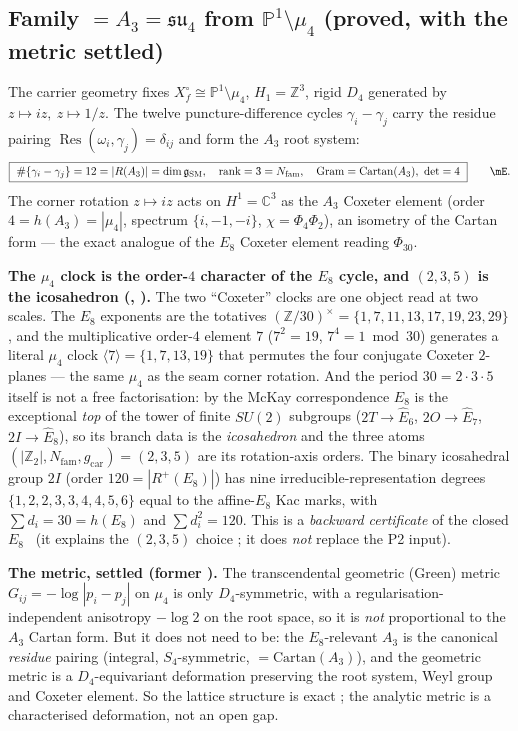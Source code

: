 \documentclass[11pt,a4paper]{article}
\newcommand{\gcar}{g_{\mathrm{car}}}
\newcommand{\Nfam}{N_{\mathrm{fam}}}
\newcommand{\dimg}{\dim\mathfrak g_{\mathrm{SM}}}
\newcommand{\Z}{\mathbb{Z}}
\theoremstyle{definition}
\begin{document}
\subsection{Family $=A_3=\mathfrak{su}_4$ from $\mathbb P^1\setminus\mu_4$ (proved, with the metric settled)}
The carrier geometry fixes $X_f^\circ\cong\mathbb P^1\setminus\mu_4$, $H_1=\mathbb Z^3$, rigid $D_4$ generated by
$z\mapsto iz,\ z\mapsto1/z$. The twelve puncture-difference cycles $\gamma_i-\gamma_j$ carry the
residue pairing $\operatorname{Res}(\omega_i,\gamma_j)=\delta_{ij}$ and form the $A_3$ root system:
\begin{equation}
  \boxed{\ \#\{\gamma_i-\gamma_j\}=12=|R(A_3)|=\dimg,\quad \operatorname{rank}=3=\Nfam,\quad
  \mathrm{Gram}=\mathrm{Cartan}(A_3),\ \det=4\ }\qquad\mE .
\end{equation}
The corner rotation $z\mapsto iz$ acts on $H^1=\mathbb C^3$ as the $A_3$ Coxeter element (order
$4=h(A_3)=|\mu_4|$, spectrum $\{i,-1,-i\}$, $\chi=\Phi_4\Phi_2$), an isometry of the Cartan form ---
the exact analogue of the $E_8$ Coxeter element reading $\Phi_{30}$.
\par\smallskip\noindent\textbf{The $\mu_4$ clock is the order-$4$ character of the $E_8$ cycle, and $(2,3,5)$
is the icosahedron (, ).} The two
``Coxeter'' clocks are one object read at two scales. The $E_8$ exponents are the totatives
$(\Z/30)^\times=\{1,7,11,13,17,19,23,29\}$, and the multiplicative order-$4$ element $7$ ($7^2{=}19$,
$7^4{=}1\bmod30$) generates a literal $\mu_4$ clock $\langle7\rangle=\{1,7,13,19\}$ that permutes the four
conjugate Coxeter $2$-planes --- the same $\mu_4$ as the seam corner rotation. And the period
$30=2{\cdot}3{\cdot}5$ itself is not a free factorisation: by the McKay correspondence $E_8$ is the
exceptional \emph{top} of the tower of finite $SU(2)$ subgroups ($2T{\to}\hat E_6$, $2O{\to}\hat E_7$,
$2I{\to}\hat E_8$), so its branch data is the \emph{icosahedron} and the three atoms $(|\Z_2|,\Nfam,\gcar)
=(2,3,5)$ are its rotation-axis orders. The binary icosahedral group $2I$ (order $120=|R^+(E_8)|$) has nine
irreducible-representation degrees $\{1,2,2,3,3,4,4,5,6\}$ equal to the affine-$E_8$ Kac marks, with
$\sum d_i=30=h(E_8)$ and $\sum d_i^2=120$. This is a \emph{backward certificate} of the closed $E_8$ \mE\
(it explains the $(2,3,5)$ choice \mC; it does \emph{not} replace the P2 input).
\par\smallskip\noindent\textbf{The metric, settled (former \mC).}
The transcendental geometric (Green) metric $G_{ij}=-\log|p_i-p_j|$ on $\mu_4$ is only
$D_4$-symmetric, with a regularisation-independent anisotropy $-\log2$ on the root space, so it is
\emph{not} proportional to the $A_3$ Cartan form. But it does not need to be: the $E_8$-relevant $A_3$
is the canonical \emph{residue} pairing (integral, $S_4$-symmetric, $=\mathrm{Cartan}(A_3)$), and the
geometric metric is a $D_4$-equivariant deformation preserving the root system, Weyl group and Coxeter
element. So the lattice structure is exact \mE; the analytic metric is a characterised deformation,
not an open gap.
\par\smallskip
\end{document}
